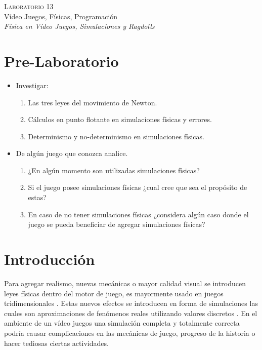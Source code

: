 \begin{center}
\textsc{\Large Laboratorio 13}~\\
{\large Vídeo Juegos, Físicas, Programación}~\\
\emph{Física en Vídeo Juegos, Simulaciones y Ragdolls}
\end{center}

\section{Pre-Laboratorio}
\begin{itemize}
\item Investigar:
\begin{enumerate}
  \item Las tres leyes del movimiento de Newton.
  \item Cálculos en punto flotante en simulaciones físicas y errores.
  \item Determinismo y no-determinismo en simulaciones físicas.
\end{enumerate}
\item De algún juego que conozca analice.
\begin{enumerate}
  \item ¿En algún momento son utilizadas simulaciones físicas? 
  \item Si el juego posee simulaciones físicas ¿cual cree que sea el propósito de estas?
  \item En caso de no tener simulaciones físicas ¿considera algún caso donde el juego se pueda beneficiar de agregar simulaciones físicas?
\end{enumerate}
\end{itemize}

\section{Introducción}
Para agregar realismo, nuevas mecánicas o mayor calidad visual se introducen leyes físicas dentro del motor de juego, es mayormente usado en juegos tridimensionales \cite[p.~325]{jenkinscreatinggames}. Estas nuevos efectos se introducen en forma de simulaciones las cuales son aproximaciones de fenómenos reales utilizando valores discretos \cite{ian_gamephysics}. En el ambiente de un vídeo juegos una simulación completa y totalmente correcta podría causar complicaciones en las mecánicas de juego, progreso de la historia o hacer tediosas ciertas actividades.

